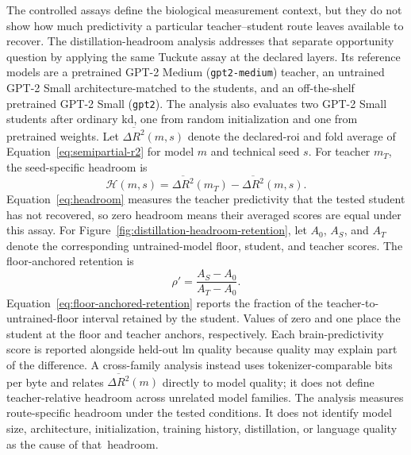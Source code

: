 The controlled assays define the biological measurement context, but they do not show how much predictivity a particular teacher--student route leaves available to recover.
The distillation-headroom analysis addresses that separate opportunity question by applying the same Tuckute assay at the declared layers.
Its reference models are a pretrained GPT-2 Medium (\texttt{gpt2-medium}) teacher, an untrained GPT-2 Small architecture-matched to the students, and an off-the-shelf pretrained GPT-2 Small (\texttt{gpt2}).
The analysis also evaluates two GPT-2 Small students after ordinary \ac{kd}, one from random initialization and one from pretrained weights.
Let \(\overline{\Delta R^2}(m,s)\) denote the declared-\ac{roi} and fold average of Equation~\ref{eq:semipartial-r2} for model \(m\) and technical seed \(s\).
For teacher \(m_T\), the seed-specific headroom is
\begin{equation}
\mathcal H(m,s)
=
\overline{\Delta R^2}(m_T)
-
\overline{\Delta R^2}(m,s).
\label{eq:headroom}
\end{equation}
Equation~\ref{eq:headroom} measures the teacher predictivity that the tested student has not recovered, so zero headroom means their averaged scores are equal under this assay.
For Figure~\ref{fig:distillation-headroom-retention}, let \(A_0\), \(A_S\), and \(A_T\) denote the corresponding untrained-model floor, student, and teacher scores.
The floor-anchored retention is
\begin{equation}
\rho'
=
\frac{A_S-A_0}{A_T-A_0}.
\label{eq:floor-anchored-retention}
\end{equation}
Equation~\ref{eq:floor-anchored-retention} reports the fraction of the teacher-to-untrained-floor interval retained by the student.
Values of zero and one place the student at the floor and teacher anchors, respectively.
Each brain-predictivity score is reported alongside held-out \ac{lm} quality because quality may explain part of the difference.
A cross-family analysis instead uses tokenizer-comparable bits per byte and relates \(\overline{\Delta R^2}(m)\) directly to model quality; it does not define teacher-relative headroom across unrelated model families.
The analysis measures route-specific headroom under the tested conditions.
It does not identify model size, architecture, initialization, training history, distillation, or language quality as the cause of that~headroom.

